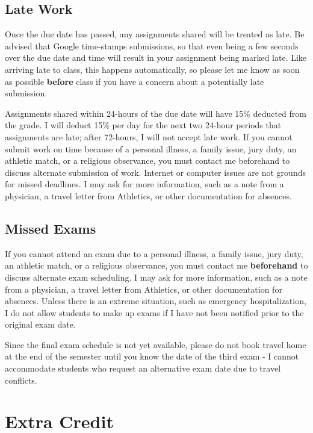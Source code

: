 \documentclass[]{book}
\begin{document}
\hypertarget{late-work}{%
\subsection{Late Work}\label{late-work}}

Once the due date has passed, any assignments shared will be treated as late. Be advised that Google time-stamps submissions, so that even being a few seconds over the due date and time will result in your assignment being marked late. Like arriving late to class, this happens automatically, so please let me know as soon as possible \textbf{before} class if you have a concern about a potentially late submission.

Assignments shared within 24-hours of the due date will have 15\% deducted from the grade. I will deduct 15\% per day for the next two 24-hour periods that assignments are late; after 72-hours, I will not accept late work. If you cannot submit work on time because of a personal illness, a family issue, jury duty, an athletic match, or a religious observance, you must contact me beforehand to discuss alternate submission of work. Internet or computer issues are not grounds for missed deadlines. I may ask for more information, such as a note from a physician, a travel letter from Athletics, or other documentation for absences.

\hypertarget{missed-exams}{%
\subsection{Missed Exams}\label{missed-exams}}

If you cannot attend an exam due to a personal illness, a family issue, jury duty, an athletic match, or a religious observance, you must contact me \textbf{beforehand} to discuss alternate exam scheduling. I may ask for more information, such as a note from a physician, a travel letter from Athletics, or other documentation for absences. Unless there is an extreme situation, such as emergency hospitalization, I do not allow students to make up exams if I have not been notified prior to the original exam date.

Since the final exam schedule is not yet available, please do not book travel home at the end of the semester until you know the date of the third exam - I cannot accommodate students who request an alternative exam date due to travel conflicts.

\hypertarget{extra-credit}{%
\section{Extra Credit}\label{extra-credit}}
\end{document}
